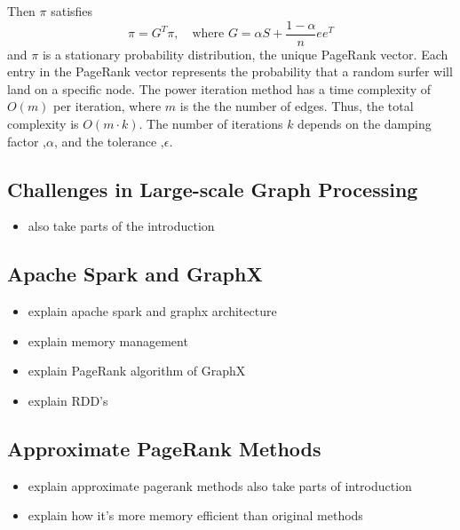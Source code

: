 Then $\pi$ satisfies 
\begin{equation}
    \pi=G^T\pi, \quad \text{where $G=\alpha S +\frac{1-\alpha}{n}ee^T$}
\end{equation}
and $\pi$ is a stationary probability distribution, the unique PageRank vector.
Each entry in the PageRank vector represents the probability that a random surfer will land on a specific node. The power iteration method has a time complexity of $O(m)$ per iteration, where $m$ is the the number of edges. Thus, the total complexity is $O(m\cdot k)$. The number of iterations $k$ depends on the damping factor ,$\alpha$, and the tolerance ,$\epsilon$.

 
\subsection{Challenges in Large-scale Graph Processing}
\begin{itemize}
  \item also take parts of the introduction
\end{itemize}

\subsection{Apache Spark and GraphX}
\begin{itemize}
    \item explain apache spark and graphx architecture
    \item explain memory management
    \item explain PageRank algorithm of GraphX
    \item explain RDD's
\end{itemize}

\subsection{Approximate PageRank Methods}
\begin{itemize}
    \item explain approximate pagerank methods also take parts of introduction
    \item explain how it's more memory efficient than original methods
\end{itemize}